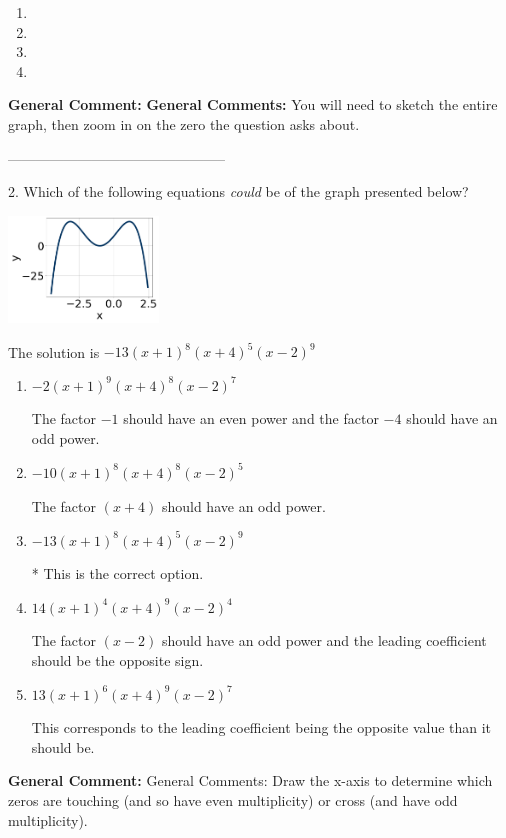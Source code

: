 \documentclass{extbook}[14pt]
\begin{document}
\begin{enumerate}[label=\Alph*.] 
\item   
\item   
\item   
\item   
\end{enumerate} 
 
\textbf{General Comment:} \textbf{General Comments:} You will need to sketch the entire graph, then zoom in on the zero the question asks about. 

-----------------------------------------------

2. Which of the following equations \textit{could} be of the graph presented below?
\begin{center} \includegraphics[width=0.3\textwidth]{../Figures/polyGraphToFunctionB.png} \end{center} 

The solution is $ -13(x + 1)^{8} (x + 4)^{5} (x - 2)^{9} $ 

\begin{enumerate}[label=\Alph*.] 
\item $ -2(x + 1)^{9} (x + 4)^{8} (x - 2)^{7} $ 

 The factor $-1$ should have an even power and the factor $-4$ should have an odd power. 
\item $ -10(x + 1)^{8} (x + 4)^{8} (x - 2)^{5} $ 

 The factor $(x + 4)$ should have an odd power. 
\item $ -13(x + 1)^{8} (x + 4)^{5} (x - 2)^{9} $ 

 * This is the correct option. 
\item $ 14(x + 1)^{4} (x + 4)^{9} (x - 2)^{4} $ 

 The factor $(x - 2)$ should have an odd power and the leading coefficient should be the opposite sign. 
\item $ 13(x + 1)^{6} (x + 4)^{9} (x - 2)^{7} $ 

 This corresponds to the leading coefficient being the opposite value than it should be. 
\end{enumerate} 
 
\textbf{General Comment:} General Comments: Draw the x-axis to determine which zeros are touching (and so have even multiplicity) or cross (and have odd multiplicity). 
\end{document}
